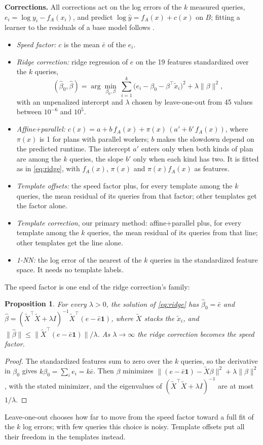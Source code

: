\documentclass[conference]{IEEEtran}
\newtheorem{proposition}{Proposition}
\begin{document}
\textbf{Corrections.} All corrections act on the log errors of the $k$
measured queries, $e_i = \log y_i - f_A(x_i)$, and predict
$\log \hat y = f_A(x) + c(x)$ on $B$; fitting a learner to the residuals of
a base model follows \cite{didona2015}.
\begin{itemize}
\item \emph{Speed factor:} $c$ is the mean $\bar e$ of the $e_i$.
\item \emph{Ridge correction:} ridge regression \cite{hoerl1970} of $e$ on
  the 19 features standardized over the $k$ queries,
  \begin{equation}
  (\hat\beta_0,\hat\beta)=\arg\min_{\beta_0,\beta}\ \textstyle\sum_{i=1}^k\bigl(e_i-\beta_0-\beta^\top\tilde x_i\bigr)^2+\lambda\|\beta\|^2,
  \label{eq:ridge}
  \end{equation}
  with an unpenalized intercept and $\lambda$ chosen by leave-one-out
  \cite{golub1979} from 45 values between $10^{-6}$ and $10^{5}$.
\item \emph{Affine+parallel:} $c(x) = a + b\,f_A(x) + \pi(x)\,(a' + b'\,f_A(x))$,
  where $\pi(x)$ is 1 for plans with parallel workers; $b$ makes the
  slowdown depend on the predicted runtime. The intercept $a'$ enters only
  when both kinds of plan are among the $k$ queries, the slope $b'$ only
  when each kind has two. It is fitted as in \eqref{eq:ridge}, with
  $f_A(x)$, $\pi(x)$ and $\pi(x)f_A(x)$ as features.
\item \emph{Template offsets:} the speed factor plus, for every template
  among the $k$ queries, the mean residual of its queries from that factor;
  other templates get the factor alone.
\item \emph{Template correction}, our primary method: affine+parallel plus,
  for every template among the $k$ queries, the mean residual of its
  queries from that line; other templates get the line alone.
\item \emph{1-NN:} the log error of the nearest of the $k$ queries in the
  standardized feature space. It needs no template labels.
\end{itemize}
The speed factor is one end of the ridge correction's family:
\begin{proposition}\label{prop:limit}
For every $\lambda>0$, the solution of \eqref{eq:ridge} has
$\hat\beta_0=\bar e$ and
$\hat\beta=(\tilde X^\top\tilde X+\lambda I)^{-1}\tilde X^\top(e-\bar e\mathbf 1)$,
where $\tilde X$ stacks the $\tilde x_i$, and
$\|\hat\beta\|\le\|\tilde X^\top(e-\bar e\mathbf 1)\|/\lambda$. As
$\lambda\to\infty$ the ridge correction becomes the speed factor.
\end{proposition}
\begin{proof}
The standardized features sum to zero over the $k$ queries, so the
derivative in $\beta_0$ gives $k\beta_0=\sum_i e_i=k\bar e$. Then $\beta$
minimizes $\|(e-\bar e\mathbf 1)-\tilde X\beta\|^2+\lambda\|\beta\|^2$,
with the stated minimizer, and the eigenvalues of
$(\tilde X^\top\tilde X+\lambda I)^{-1}$ are at most $1/\lambda$.
\end{proof}
Leave-one-out chooses how far to move from the speed factor toward a full
fit of the $k$ log errors; with few queries this choice is noisy. Template offsets
put all their freedom in the templates instead.
\end{document}
